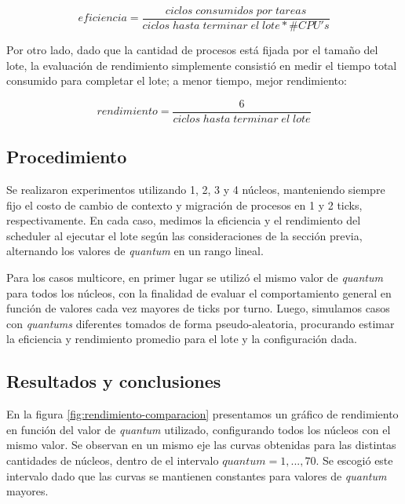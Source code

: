 $$eficiencia = \frac{ciclos\;consumidos\;por\;tareas}{ciclos\;hasta\;terminar\;el\;lote * \#CPU's}$$

Por otro lado, dado que la cantidad de procesos está fijada por el tamaño del lote, la evaluación de rendimiento simplemente consistió en medir el tiempo total consumido para completar el lote; a menor tiempo, mejor rendimiento:

$$rendimiento = \frac{6}{ciclos\;hasta\;terminar\;el\;lote}$$

\subsection{Procedimiento}

Se realizaron experimentos utilizando 1, 2, 3 y 4 núcleos, manteniendo siempre fijo el costo de cambio de contexto y migración de procesos en 1 y 2 ticks, respectivamente. En cada caso, medimos la eficiencia y el rendimiento del scheduler al ejecutar el lote según las consideraciones de la sección previa, alternando los valores de \textit{quantum} en un rango lineal.

Para los casos multicore, en primer lugar se utilizó el mismo valor de \textit{quantum} para todos los núcleos, con la finalidad de evaluar el comportamiento general en función de valores cada vez mayores de ticks por turno. Luego, simulamos casos con \textit{quantums} diferentes tomados de forma pseudo-aleatoria, procurando estimar la eficiencia y rendimiento promedio para el lote y la configuración dada.

\subsection{Resultados y conclusiones}

En la figura \ref{fig:rendimiento-comparacion} presentamos un gráfico de rendimiento en función del valor de \textit{quantum} utilizado, configurando todos los núcleos con el mismo valor. Se observan en un mismo eje las curvas obtenidas para las distintas cantidades de núcleos, dentro de el intervalo $\textit{quantum} = 1, ..., 70$. Se escogió este intervalo dado que las curvas se mantienen constantes para valores de \textit{quantum} mayores.

